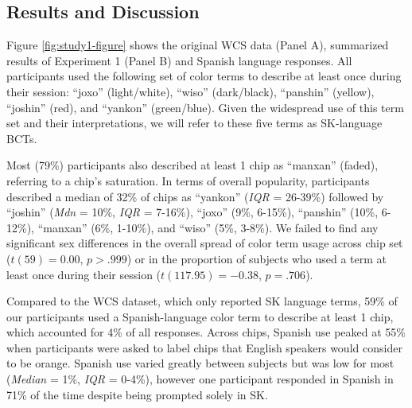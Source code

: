 \documentclass[
  english,
  ,man,floatsintext]{apa6}
\begin{document}
\hypertarget{results-and-discussion}{%
\subsection{Results and Discussion}\label{results-and-discussion}}

Figure \ref{fig:study1-figure} shows the original WCS data (Panel A), summarized results of Experiment 1 (Panel B) and Spanish language responses. All participants used the following set of color terms to describe at least once during their session: \enquote{joxo} (light/white), \enquote{wiso} (dark/black), \enquote{panshin} (yellow), \enquote{joshin} (red), and \enquote{yankon} (green/blue). Given the widespread use of this term set and their interpretations, we will refer to these five terms as SK-language BCTs.

Most (79\%) participants also described at least 1 chip as \enquote{manxan} (faded), referring to a chip's saturation. In terms of overall popularity, participants described a median of 32\% of chips as \enquote{yankon} (\emph{IQR} = 26-39\%) followed by \enquote{joshin} (\emph{Mdn} = 10\%, \emph{IQR} = 7-16\%), \enquote{joxo} (9\%, 6-15\%), \enquote{panshin} (10\%, 6-12\%), \enquote{manxan} (6\%, 1-10\%), and \enquote{wiso} (5\%, 3-8\%). We failed to find any significant sex differences in the overall spread of color term usage across chip set (\(t(59) = 0.00\), \(p > .999\)) or in the proportion of subjects who used a term at least once during their session (\(t(117.95) = -0.38\), \(p = .706\)).

Compared to the WCS dataset, which only reported SK language terms, 59\% of our participants used a Spanish-language color term to describe at least 1 chip, which accounted for 4\% of all responses. Across chips, Spanish use peaked at 55\% when participants were asked to label chips that English speakers would consider to be orange. Spanish use varied greatly between subjects but was low for most (\emph{Median} = 1\%, \emph{IQR} = 0-4\%), however one participant responded in Spanish in 71\% of the time despite being prompted solely in SK.
\end{document}
